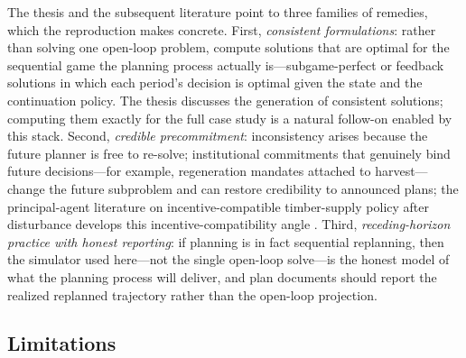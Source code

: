 \documentclass[12pt]{article}
\begin{document}
The thesis and the subsequent literature point to three families of remedies, which the reproduction makes concrete. First, \emph{consistent formulations}: rather than solving one open-loop problem, compute solutions that are optimal for the sequential game the planning process actually is---subgame-perfect or feedback solutions in which each period's decision is optimal given the state and the continuation policy. The thesis discusses the generation of consistent solutions; computing them exactly for the full case study is a natural follow-on enabled by this stack. Second, \emph{credible precommitment}: inconsistency arises because the future planner is free to re-solve; institutional commitments that genuinely bind future decisions---for example, regeneration mandates attached to harvest---change the future subproblem and can restore credibility to announced plans; the principal-agent literature on incentive-compatible timber-supply policy after disturbance develops this incentive-compatibility angle \citep{bogle2015protecting}. Third, \emph{receding-horizon practice with honest reporting}: if planning is in fact sequential replanning, then the simulator used here---not the single open-loop solve---is the honest model of what the planning process will deliver, and plan documents should report the realized replanned trajectory rather than the open-loop projection.

\hypertarget{limitations}{%
\subsection{Limitations}\label{limitations}}
\end{document}
